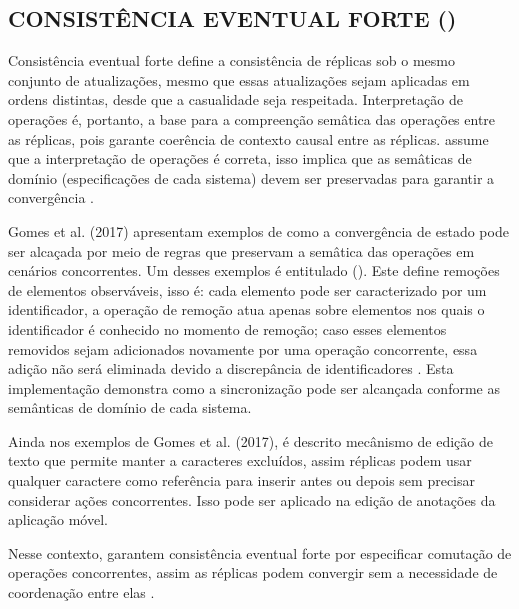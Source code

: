 \subsection{CONSISTÊNCIA EVENTUAL FORTE ()}

Consistência eventual forte define a consistência de réplicas sob o mesmo conjunto de atualizações, mesmo que essas atualizações sejam aplicadas em ordens distintas, desde que a casualidade seja respeitada. Interpretação de operações é, portanto, a base para a compreenção semâtica das operações entre as réplicas, pois garante coerência de contexto causal entre as réplicas.  assume que a interpretação de operações é correta, isso implica que as semâticas de domínio (especificações de cada sistema) devem ser preservadas para garantir a convergência \cite{Gomes2017VerifyingSEC}.

Gomes et al. (2017) apresentam exemplos de como a convergência de estado pode ser alcaçada por meio de regras que preservam a semâtica das operações em cenários concorrentes. Um desses exemplos é entitulado  (). Este define remoções de elementos observáveis, isso é: cada elemento pode ser caracterizado por um identificador, a operação de remoção atua apenas sobre elementos nos quais o identificador é conhecido no momento de remoção; caso esses elementos removidos sejam adicionados novamente por uma operação concorrente, essa adição não será eliminada devido a discrepância de identificadores \cite{Gomes2017VerifyingSEC}. Esta implementação demonstra como a sincronização pode ser alcançada conforme as semânticas de domínio de cada sistema.

Ainda nos exemplos de Gomes et al. (2017), é descrito mecânismo de edição de texto que permite manter a caracteres excluídos, assim réplicas podem usar qualquer caractere como referência para inserir antes ou depois sem precisar considerar ações concorrentes. Isso pode ser aplicado na edição de anotações da aplicação móvel.

Nesse contexto,  garantem consistência eventual forte por especificar comutação de operações concorrentes, assim as réplicas podem convergir sem a necessidade de coordenação entre elas \cite{Shapiro2015CRDT}. 
